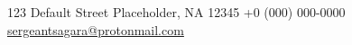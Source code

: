 \documentclass[lighthipster]{simplehipstercv}
\newlength{\rightcolwidth}
\begin{document}
\begin{paracol}{2}
\begin{comment}
\section*{Languages}
\begin{tabular}{l | ll}
\textbf{English} & C2 & {\phantom{x}\footnotesize mother tongue} \\
\textbf{Japanese} & A1 & \pictofraction{\faCircle}{cvred}{1}{black!30}{3}{\tiny}
\end{tabular}
\end{comment}
\bigskip

\hfill
\begin{minipage}[t]{0.3\textwidth}
\begin{comment}
\section*{Publications}
\begin{tabular}{>{\footnotesize\bfseries}r >{\footnotesize}p{0.7\textwidth}}
    1729 & \emph{How I almost got killed by Lady Swan}, Tortuga Printing Press. \\
    1720 & ``Privateering for Beginners'', in: \emph{The Pragmatic Pirate} (1/1720).
\end{tabular}
\end{comment}
\bigskip
\begin{comment}
\section*{Talks}
\begin{tabular}{>{\footnotesize\bfseries}r >{\footnotesize}p{0.6\textwidth}}
    Nov. 1726 & ``How I lost my ship (\& and how to get it back)'', at: \emph{Annual Pirate's Conference} in Tortuga, Nov. 1726.
\end{tabular}
\end{comment}
\end{minipage}






\vfill{} %

\setlength{\parindent}{0pt}
\begin{minipage}[t]{\rightcolwidth}
\begin{center}\fontfamily{\sfdefault}\selectfont \color{black!70}
{\small {} 123 Default Street  Placeholder, NA 12345  +0 (000) 000-0000 \newline{} \protect\url{sergeantsagara@protonmail.com}
}
\end{center}
\end{minipage}

\end{paracol}
\end{document}
